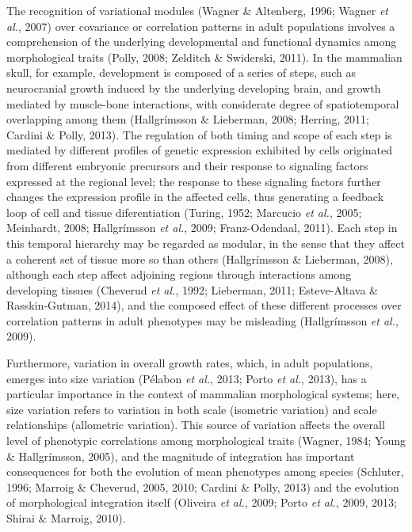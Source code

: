 \documentclass[12pt,]{article}
\begin{document}
The recognition of variational modules (Wagner \& Altenberg, 1996;
Wagner \emph{et al.}, 2007) over covariance or correlation patterns in
adult populations involves a comprehension of the underlying
developmental and functional dynamics among morphological traits (Polly,
2008; Zelditch \& Swiderski, 2011). In the mammalian skull, for example,
development is composed of a series of steps, such as neurocranial
growth induced by the underlying developing brain, and growth mediated
by muscle-bone interactions, with considerate degree of spatiotemporal
overlapping among them (Hallgrímsson \& Lieberman, 2008; Herring, 2011;
Cardini \& Polly, 2013). The regulation of both timing and scope of each
step is mediated by different profiles of genetic expression exhibited
by cells originated from different embryonic precursors and their
response to signaling factors expressed at the regional level; the
response to these signaling factors further changes the expression
profile in the affected cells, thus generating a feedback loop of cell
and tissue diferentiation (Turing, 1952; Marcucio \emph{et al.}, 2005;
Meinhardt, 2008; Hallgrímsson \emph{et al.}, 2009; Franz-Odendaal,
2011). Each step in this temporal hierarchy may be regarded as modular,
in the sense that they affect a coherent set of tissue more so than
others (Hallgrímsson \& Lieberman, 2008), although each step affect
adjoining regions through interactions among developing tissues
(Cheverud \emph{et al.}, 1992; Lieberman, 2011; Esteve-Altava \&
Rasskin-Gutman, 2014), and the composed effect of these different
processes over correlation patterns in adult phenotypes may be
misleading (Hallgrímsson \emph{et al.}, 2009).

Furthermore, variation in overall growth rates, which, in adult
populations, emerges into size variation (Pélabon \emph{et al.}, 2013;
Porto \emph{et al.}, 2013), has a particular importance in the context
of mammalian morphological systems; here, size variation refers to
variation in both scale (isometric variation) and scale relationships
(allometric variation). This source of variation affects the overall
level of phenotypic correlations among morphological traits (Wagner,
1984; Young \& Hallgrímsson, 2005), and the magnitude of integration has
important consequences for both the evolution of mean phenotypes among
species (Schluter, 1996; Marroig \& Cheverud, 2005, 2010; Cardini \&
Polly, 2013) and the evolution of morphological integration itself
(Oliveira \emph{et al.}, 2009; Porto \emph{et al.}, 2009, 2013; Shirai
\& Marroig, 2010).
\end{document}
